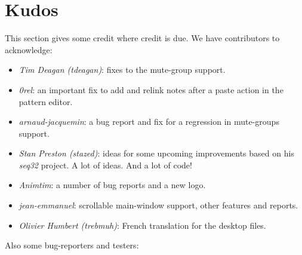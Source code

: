 %
%
%

\section{Kudos}
\label{sec:kudos}

   This section gives some credit where credit is due.
   We have contributors to acknowledge:

   \begin{itemize}
      \item \textsl{Tim Deagan (tdeagan)}:
         fixes to the mute-group support.
      \item \textsl{0rel}:
         an important fix to add and relink notes after a
         paste action in the pattern editor.
      \item \textsl{arnaud-jacquemin}:
         a bug report and fix for a regression in mute-groups support.
      \item \textsl{Stan Preston (stazed)}:
         ideas for some upcoming improvements based
         on his \textsl{seq32} project.  A lot of ideas.
         And a lot of code!
      \item \textsl{Animtim}:
         a number of bug reports and a new logo.
      \item \textsl{jean-emmanuel}:
         scrollable main-window support, other features and reports.
      \item \textsl{Olivier Humbert (trebmuh)}:
         French translation for the desktop files.
   \end{itemize}

   Also some bug-reporters and testers:

